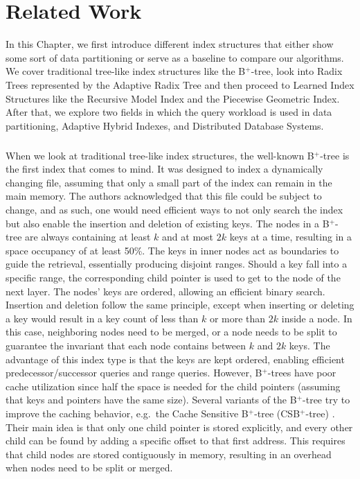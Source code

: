 \thispagestyle{plain}
\chapter{Related Work}\label{sec:related_work}

In this Chapter, we first introduce different index structures that either show some sort of data partitioning or serve as a baseline to compare our algorithms. We cover traditional tree-like index structures like the B$^+$-tree, look into Radix Trees represented by the Adaptive Radix Tree and then proceed to Learned Index Structures like the Recursive Model Index and the Piecewise Geometric Index. After that, we explore two fields in which the query workload is used in data partitioning, Adaptive Hybrid Indexes, and Distributed Database Systems.

\paragraph{} 
When we look at traditional tree-like index structures, the well-known B$^+$-tree \cite{Bayer1970-rh} is the first index that comes to mind. It was designed to index a dynamically changing file, assuming that only a small part of the index can remain in the main memory. The authors acknowledged that this file could be subject to change, and as such, one would need efficient ways to not only search the index but also enable the insertion and deletion of existing keys. The nodes in a B$^+$-tree are always containing at least $k$ and at most $2k$ keys at a time, resulting in a space occupancy of at least 50\%. The keys in inner nodes act as boundaries to guide the retrieval, essentially producing disjoint ranges. Should a key fall into a specific range, the corresponding child pointer is used to get to the node of the next layer. The nodes' keys are ordered, allowing an efficient binary search. Insertion and deletion follow the same principle, except when inserting or deleting a key would result in a key count of less than $k$ or more than $2k$ inside a node. In this case, neighboring nodes need to be merged, or a node needs to be split to guarantee the invariant that each node contains between $k$ and $2k$ keys. The advantage of this index type is that the keys are kept ordered, enabling efficient predecessor/successor queries and range queries. However, B$^+$-trees have poor cache utilization since half the space is needed for the child pointers (assuming that keys and pointers have the same size). Several variants of the B$^+$-tree try to improve the caching behavior, e.g.~the Cache Sensitive B$^+$-tree (CSB$^+$-tree) \cite{Rao2000}. Their main idea is that only one child pointer is stored explicitly, and every other child can be found by adding a specific offset to that first address. This requires that child nodes are stored contiguously in memory, resulting in an overhead when nodes need to be split or merged.

